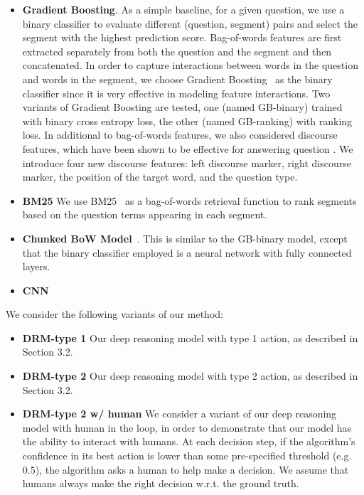 \begin{itemize}
    \item \textbf{Gradient Boosting}. As a simple baseline, for a given question, we use a binary classifier to evaluate  different (question, segment) pairs and select the segment with the highest prediction score. Bag-of-words features are first extracted separately from both the question and the segment and then concatenated. In order to capture interactions between words in the question and words in the segment, we choose Gradient Boosting~\cite{friedman2001greedy} as the binary classifier since it is very effective in modeling feature interactions. Two variants of Gradient Boosting are tested, one (named GB-binary) trained with binary cross entropy loss, the other (named GB-ranking) with ranking loss. In additional to bag-of-words features, we also considered discourse features, which have been shown to be effective for answering question \cite{DBLP:conf/acl/JansenSC14,DBLP:conf/acl/NarasimhanB15}. We introduce four new discourse features: left discourse marker, right discourse marker, the position of the target word, and the question type.
    \item \textbf{BM25} We use BM25~\cite{DBLP:journals/ftir/RobertsonZ09} as a bag-of-words retrieval function to rank segments based on the question terms appearing in each segment.
    
    \item \textbf{Chunked BoW Model}~\cite{DBLP:conf/acl/ChoiHUPLB17}. This is similar to the GB-binary model, except that the binary classifier employed is a neural network with fully connected layers.
    \item \textbf{CNN}~\cite{DBLP:conf/acl/ChoiHUPLB17} 
\end{itemize}


We consider the following variants of our method:
\begin{itemize}
\item \textbf{DRM-type 1} Our deep reasoning model with type 1 action, as described in Section 3.2.
\item \textbf{DRM-type 2} Our deep reasoning model with type 2 action, as described in Section 3.2.
\item \textbf{DRM-type 2 w/ human} We consider a variant of our deep reasoning model with human in the loop, in order to demonstrate that our model has the ability to interact with humans. At each decision step, if the algorithm's confidence in its best action is lower than some pre-specified threshold (e.g. 0.5), the algorithm asks a human to help make a decision. We assume that humans always make the right decision w.r.t. the ground truth. 
\end{itemize}

